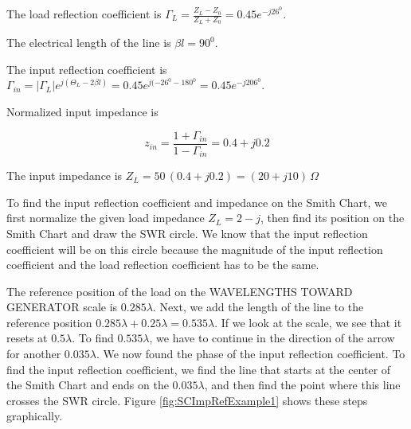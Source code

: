 \documentclass{ximera}
\begin{document}
\begin{example}
\begin{explanation}
The load reflection coefficient  is  $\Gamma_{L}=\frac{Z_L-Z_0}{Z_L+Z_0} =0.45 e^{-j 26^0 }$. 

The electrical length of the line is $\beta l =90^0$. 

The input reflection coefficient is $\Gamma_{in} = |\Gamma_L| e^{j(\Theta_{L} -2 \beta l) } =0.45 e^{j(-26^0 -180^0 }=0.45 e^{-j206^0} $.

Normalized input impedance is 

\begin{equation}
z_{in}=\frac{1+\Gamma_{in}}{1-\Gamma_{in}} = 0.4+ j 0.2
\end{equation}

The input impedance is $Z_L=50 \, (0.4 + j 0.2)= (20 + j 10) \, \Omega$


To find the input reflection coefficient and impedance on the Smith Chart, we first normalize the given load impedance 
$Z_L=2-j$,  then find its position on the Smith Chart and draw the SWR circle. We know that the input reflection coefficient will be on this circle because the magnitude of the input reflection coefficient and the load reflection coefficient has to be the same.

The reference position of the load on the WAVELENGTHS TOWARD GENERATOR scale is $0.285 \lambda$. Next, we add the length of the line to the reference position $0.285 \lambda + 0.25 \lambda = 0.535 \lambda$. If we look at the scale, we see that it resets at $0.5 \lambda$. To find $0.535 \lambda$, we have to continue in the direction of the arrow for another $0.035 \lambda$. We now found the phase of the input reflection coefficient. To find the input reflection coefficient, we find the line that starts at the center of the Smith Chart and ends on the $0.035 \lambda$, and then find the point where this line crosses the SWR circle. Figure \ref{fig:SCImpRefExample1} shows these steps graphically.


\end{explanation}
\end{example}
\end{document}
